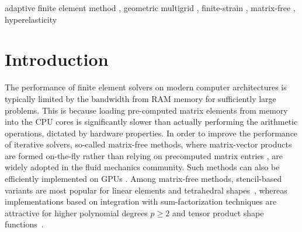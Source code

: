 \documentclass[AMA,STIX1COL]{WileyNJD-v2}
\begin{document}
\begin{frontmatter}

  \maketitle

\else

    \begin{keyword}
        adaptive finite element method \sep
        geometric multigrid \sep
        finite-strain \sep
        matrix-free \sep
        hyperelasticity
    \end{keyword}

\end{frontmatter}
\fi

\section{Introduction}

The performance of finite element solvers on modern computer architectures is typically limited by the bandwidth from RAM memory for sufficiently large problems.
This is because loading pre-computed matrix elements from memory into the CPU cores is significantly slower than actually performing the arithmetic operations, dictated by hardware properties.
In order to improve the performance of iterative solvers, so-called matrix-free methods,
where matrix-vector products are formed on-the-fly rather than relying on precomputed matrix entries \cite{Brown2010,kronbichler12,May2015, Krank2017,  Gmeiner2016},
are widely adopted in the fluid mechanics community.
Such methods can also be efficiently implemented on GPUs \cite{Abdelfattah2016, ljungkvist2017multigrid}.
Among matrix-free methods, stencil-based variants are most popular for linear elements and tetrahedral shapes~\cite{Gmeiner2016,Bauer2018},
whereas implementations based on integration with sum-factorization techniques are attractive for higher polynomial degrees $p\geq 2$
and tensor product shape functions~\cite{Brown2010,kronbichler12,May2015,Cantwell2011}.
\end{document}
